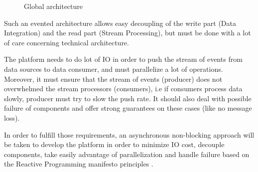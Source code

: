 \begin{figure}[h]
  \begin{center}
    \caption{Global architecture}
    \label{fig:main_archi}
  \end{center}
\end{figure}

Such an evented architecture allows easy decoupling of the write part (Data Integration) and the read part (Stream Processing),
but must be done with a lot of care concerning technical architecture.

The platform needs to do lot of IO in order to push the stream of events from data sources to data consumer, and must
parallelize a lot of operations. Moreover, it must ensure that the stream of events (producer) does not overwhelmed the stream
processors (consumers), i.e if consumers process data slowly, producer must try to slow the push rate. It should also deal with possible
failure of components and offer strong guarantees on these cases (like no message loss).

In order to fulfill those requirements, an asynchronous non-blocking approach will be taken to develop the platform in order to
minimize IO cost, decouple components, take easily advantage of parallelization and handle failure based on the 
Reactive Programming manifesto principles \cite{bib:reactiveManifesto}.










